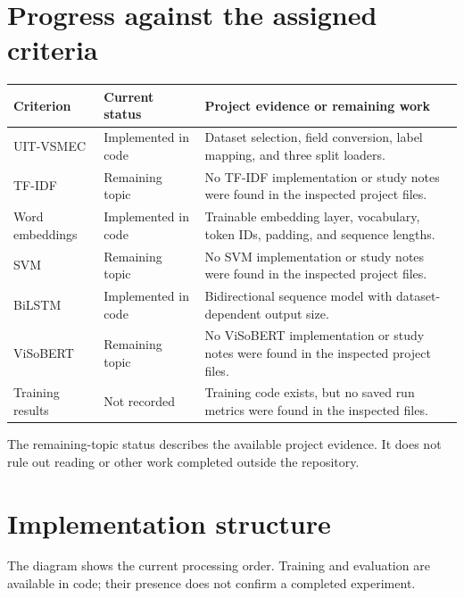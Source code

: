 \documentclass[11pt,a4paper]{article}
\begin{document}
\section{Progress against the assigned criteria}
\begin{tabularx}{\textwidth}{@{}p{2.6cm}p{2.6cm}Y@{}}
\toprule
\textbf{Criterion} & \textbf{Current status} & \textbf{Project evidence or remaining work}\\
\midrule
UIT-VSMEC & Implemented in code & Dataset selection, field conversion, label mapping, and three split loaders.\\
TF-IDF & Remaining topic & No TF-IDF implementation or study notes were found in the inspected project files.\\
Word embeddings & Implemented in code & Trainable embedding layer, vocabulary, token IDs, padding, and sequence lengths.\\
SVM & Remaining topic & No SVM implementation or study notes were found in the inspected project files.\\
BiLSTM & Implemented in code & Bidirectional sequence model with dataset-dependent output size.\\
ViSoBERT & Remaining topic & No ViSoBERT implementation or study notes were found in the inspected project files.\\
Training results & Not recorded & Training code exists, but no saved run metrics were found in the inspected files.\\
\bottomrule
\end{tabularx}

The remaining-topic status describes the available project evidence. It does not rule out reading or other work completed outside the repository.

\section{Implementation structure}
The diagram shows the current processing order. Training and evaluation are available in code; their presence does not confirm a completed experiment.
\begin{center}
\end{center}
\end{document}
